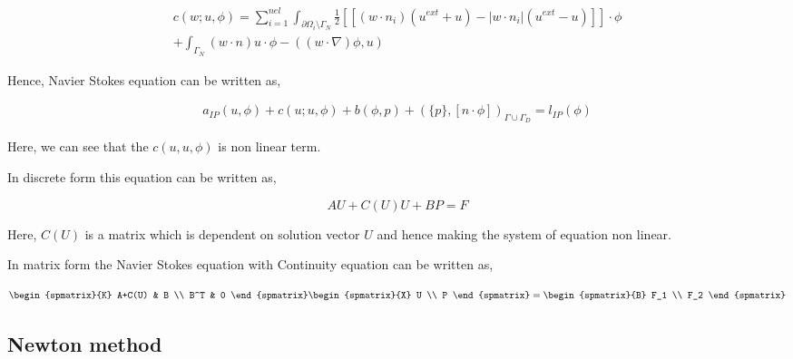 \documentclass[a4paper,12pt]{book}
\begin{document}
\begin{equation}
\begin{split}
c(w;u,\phi) = \sum_{i=1}^{nel} \int_{\partial \Omega_i \setminus \Gamma_N} \frac{1}{2} [[(w \cdot n_i)(u^{ext} + u) - |w \cdot n_i|(u^{ext} - u)]] \cdot \phi \\ + \int_{\Gamma_N} (w\cdot n) u \cdot \phi -((w\cdot \nabla)\phi,u)
\end{split}
\end{equation}

Hence, Navier Stokes equation can be written as,

\begin{equation}\label{navier_stokes_weak}
\begin{split}
a_{IP}(u,\phi) + c(u;u,\phi) + b(\phi,p) + (\{p\},[n\cdot \phi])_{\Gamma \cup \Gamma_D} = l_{IP}(\phi) 
\end{split}
\end{equation}

Here, we can see that the $c(u,u,\phi)$ is non linear term.

In discrete form this equation can be written as,

\begin{equation}
AU + C(U) U + BP = F
\end{equation} 

Here, $C(U)$ is a matrix which is dependent on solution vector $U$ and hence making the system of equation non linear.

In matrix form the Navier Stokes equation with Continuity equation can be written as,

\begin{equation} \label{Stokes_matrix}
\begin{spmatrix}{K}
    A+C(U) & B \\
    B^T & 0
\end{spmatrix}
\begin{spmatrix}{X}
    U \\
    P
\end{spmatrix}
=
\begin{spmatrix}{B}
    F_1  \\
    F_2
\end{spmatrix}
\end{equation}

\subsection{Newton method} \cite{Haasdonk}
\end{document}

